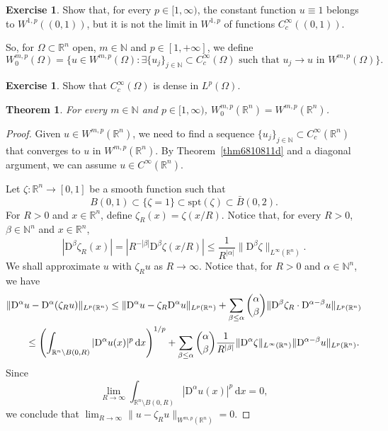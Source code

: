 \documentclass[a4paper,9pt]{amsart}
\newcommand{\N}{\mathbb{N}}	%
\newcommand{\R}{\mathbb{R}}	%
\newcommand{\did}{\,\mathrm{d}}	%
\newcommand{\Diff}{\mathrm{D}}
\newcommand{\spt}{\mathrm{spt}}
\theoremstyle{plain}
\newtheorem{theorem}[proposition]{Theorem}
\theoremstyle{definition}
\newtheorem{exercise}[proposition]{Exercise}%
\theoremstyle{remark}
\begin{document}
\begin{exercise}
	Show that, for every $p\in[1,\infty)$, the constant function $u\equiv1$ belongs to $W^{1,p}((0,1))$, but it is not the limit in $W^{1,p}$ of functions $C^\infty_c((0,1))$.
\end{exercise}

So, for $\Omega\subset\R^n$ open, $m\in\N$ and $p\in[1,+\infty]$, we define
\begin{equation}
	W^{m,p}_0(\Omega) = \{u\in W^{m,p}(\Omega): \exists\{u_j\}_{j\in\N}\subset C^\infty_c(\Omega)\text{ such that }u_j\to u\text{ in }W^{m,p}(\Omega)\} .
\end{equation}

\begin{exercise}\label{ex680f4988}
	Show that $C^\infty_c(\Omega)$ is dense in $L^p(\Omega)$.
\end{exercise}

\begin{theorem}\label{thm6810ea3d}
	For every $m\in\N$ and $p\in[1,\infty)$,
	$W^{m,p}_0(\R^n) = W^{m,p}(\R^n)$.
\end{theorem}
\begin{proof}
	Given $u\in W^{m,p}(\R^n)$, we need to find a sequence $\{u_j\}_{j\in\N}\subset C^\infty_c(\R^n)$ that converges to $u$ in $W^{m,p}(\R^n)$.
	By Theorem~\ref{thm6810811d} and a diagonal argument, we can assume $u\in C^\infty(\R^n)$.
	
	Let $\zeta:\R^n\to[0,1]$ be a smooth function such that 
	\begin{equation}
		B(0,1) \subset \{\zeta = 1\} \subset \spt(\zeta) \subset \bar B(0,2) .
	\end{equation}
	For $R>0$ and $x\in\R^n$, define $\zeta_R(x) = \zeta(x/R)$.
	Notice that, for every $R>0$, $\beta\in\N^n$ and $x\in\R^n$,
	\begin{equation}
		|\Diff^\beta\zeta_R(x)| = |R^{-|\beta|} \Diff^\beta\zeta(x/R)| 
		\le \frac1{R^{|\alpha|}} \|\Diff^\beta\zeta\|_{L^\infty(\R^n)} .
	\end{equation}
	We shall approximate $u$ with $\zeta_Ru$ as $R\to\infty$.
	Notice that, for $R>0$ and $\alpha\in\N^n$, we have
	\begin{align}
		\|\Diff^\alpha u - \Diff^\alpha(\zeta_Ru)\|_{L^p(\R^n)}
		&\le \| \Diff^\alpha u - \zeta_R\Diff^\alpha u\|_{L^p(\R^n)}
			+ \sum_{\beta\le\alpha}\binom{\alpha}{\beta} \| \Diff^\beta\zeta_R \cdot \Diff^{\alpha-\beta}u\|_{L^p(\R^n)} \\
		&\hspace{-3cm}\le \left( \int_{\R^n\setminus B(0,R)} |\Diff^\alpha u(x)|^p \did x \right)^{1/p}
			+ \sum_{\beta\le\alpha}\binom{\alpha}{\beta} \frac1{R^{|\beta|}} \|\Diff^\alpha\zeta\|_{L^\infty(\R^n)} \|\Diff^{\alpha-\beta}u\|_{L^p(\R^n)} .
	\end{align}
	Since 
	\begin{equation}
		\lim_{R\to\infty} \int_{\R^n\setminus B(0,R)} |\Diff^\alpha u(x)|^p \did x = 0,
	\end{equation}
	we conclude that 
	$\lim_{R\to\infty} \|u-\zeta_Ru\|_{W^{m,p}(\R^n)} = 0$.
\end{proof}
\end{document}
